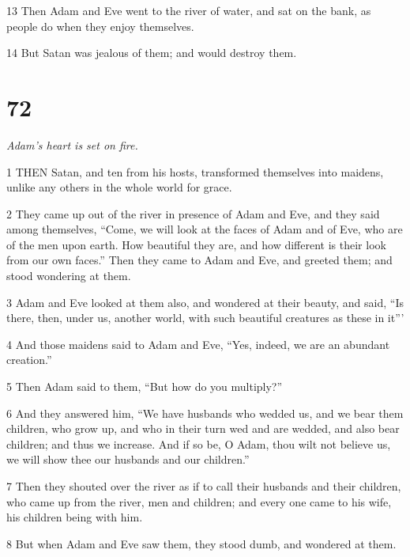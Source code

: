 \par 13 Then Adam and Eve went to the river of water, and sat on the bank, as people do when they enjoy themselves.

\par 14 But Satan was jealous of them; and would destroy them.

\chapter{72}

\par \textit{Adam's heart is set on fire.}

\par 1 THEN Satan, and ten from his hosts, transformed themselves into maidens, unlike any others in the whole world for grace.

\par 2 They came up out of the river in presence of Adam and Eve, and they said among themselves, “Come, we will look at the faces of Adam and of Eve, who are of the men upon earth. How beautiful they are, and how different is their look from our own faces.” Then they came to Adam and Eve, and greeted them; and stood wondering at them.

\par 3 Adam and Eve looked at them also, and wondered at their beauty, and said, “Is there, then, under us, another world, with such beautiful creatures as these in it”'

\par 4 And those maidens said to Adam and Eve, “Yes, indeed, we are an abundant creation.”

\par 5 Then Adam said to them, “But how do you multiply?”

\par 6 And they answered him, “We have husbands who wedded us, and we bear them children, who grow up, and who in their turn wed and are wedded, and also bear children; and thus we increase. And if so be, O Adam, thou wilt not believe us, we will show thee our husbands and our children.”

\par 7 Then they shouted over the river as if to call their husbands and their children, who came up from the river, men and children; and every one came to his wife, his children being with him.

\par 8 But when Adam and Eve saw them, they stood dumb, and wondered at them.

